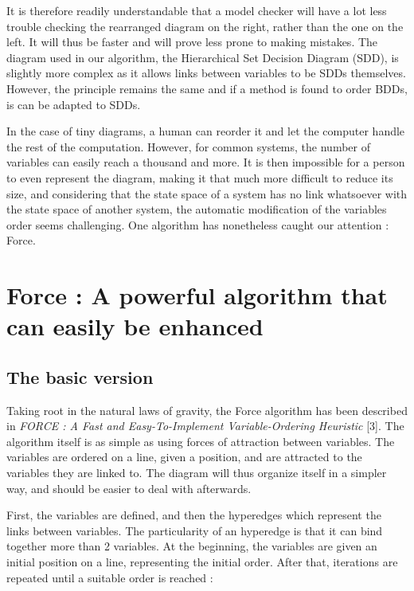 \documentclass[12pt]{report}
\begin{document}
It is therefore readily understandable that a model checker will have a lot less trouble checking the rearranged diagram on the right, rather than the one on the left. It will thus be faster and will prove less prone to making mistakes. The diagram used in our algorithm, the Hierarchical Set Decision Diagram (SDD), is slightly more complex as it allows links between variables to be SDDs themselves. However, the principle remains the same and if a method is found to order BDDs, is can be adapted to SDDs.

In the case of tiny diagrams, a human can reorder it and let the computer handle the rest of the computation. However, for common systems, the number of variables can easily reach a thousand and more. It is then impossible for a person to even represent the diagram, making it that much more difficult to reduce its size, and considering that the state space of a system has no link whatsoever with the state space of another system, the automatic modification of the variables order seems challenging. One algorithm has nonetheless caught our attention : Force.

\chapter{Force : A powerful algorithm that can easily be enhanced}

\section{The basic version}

Taking root in the natural laws of gravity, the Force algorithm has been described in \textit{FORCE : A Fast and Easy-To-Implement Variable-Ordering Heuristic} [3]. The algorithm itself is as simple as using forces of attraction between variables. The variables are ordered on a line, given a position, and are attracted to the variables they are linked to. The diagram will thus organize itself in a simpler way, and should be easier to deal with afterwards.

First, the variables are defined, and then the hyperedges which represent the links between variables. The particularity of an hyperedge is that it can bind together more than 2 variables. At the beginning, the variables are given an initial position on a line, representing the initial order. After that, iterations are repeated until a suitable order is reached :

\begin{algorithm}
\begin{algorithmic}[1]
  \Repeat
    \EndFor
    \EndFor
\EndFunction
\end{algorithmic}
\end{algorithm}
\end{document}
